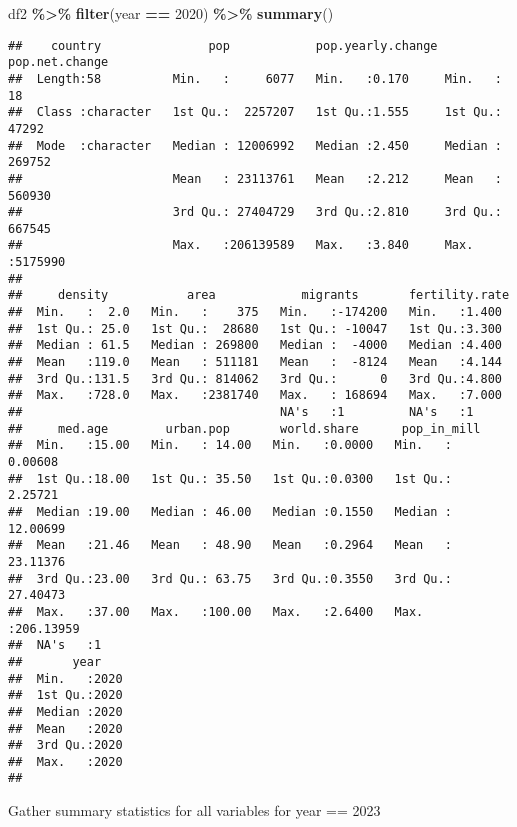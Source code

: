 \documentclass[
]{article}
\newenvironment{Shaded}{\begin{snugshade}}{\end{snugshade}}
\newcommand{\DecValTok}[1]{\textcolor[rgb]{0.00,0.00,0.81}{#1}}
\newcommand{\FunctionTok}[1]{\textcolor[rgb]{0.13,0.29,0.53}{\textbf{#1}}}
\newcommand{\NormalTok}[1]{#1}
\newcommand{\SpecialCharTok}[1]{\textcolor[rgb]{0.81,0.36,0.00}{\textbf{#1}}}
\begin{document}
\begin{Shaded}
\begin{Highlighting}[]
\NormalTok{df2 }\SpecialCharTok{\%\textgreater{}\%} 
  \FunctionTok{filter}\NormalTok{(year }\SpecialCharTok{==} \DecValTok{2020}\NormalTok{) }\SpecialCharTok{\%\textgreater{}\%} 
  \FunctionTok{summary}\NormalTok{()}
\end{Highlighting}
\end{Shaded}

\begin{verbatim}
##    country               pop            pop.yearly.change pop.net.change   
##  Length:58          Min.   :     6077   Min.   :0.170     Min.   :     18  
##  Class :character   1st Qu.:  2257207   1st Qu.:1.555     1st Qu.:  47292  
##  Mode  :character   Median : 12006992   Median :2.450     Median : 269752  
##                     Mean   : 23113761   Mean   :2.212     Mean   : 560930  
##                     3rd Qu.: 27404729   3rd Qu.:2.810     3rd Qu.: 667545  
##                     Max.   :206139589   Max.   :3.840     Max.   :5175990  
##                                                                            
##     density           area            migrants       fertility.rate 
##  Min.   :  2.0   Min.   :    375   Min.   :-174200   Min.   :1.400  
##  1st Qu.: 25.0   1st Qu.:  28680   1st Qu.: -10047   1st Qu.:3.300  
##  Median : 61.5   Median : 269800   Median :  -4000   Median :4.400  
##  Mean   :119.0   Mean   : 511181   Mean   :  -8124   Mean   :4.144  
##  3rd Qu.:131.5   3rd Qu.: 814062   3rd Qu.:      0   3rd Qu.:4.800  
##  Max.   :728.0   Max.   :2381740   Max.   : 168694   Max.   :7.000  
##                                    NA's   :1         NA's   :1      
##     med.age        urban.pop       world.share      pop_in_mill       
##  Min.   :15.00   Min.   : 14.00   Min.   :0.0000   Min.   :  0.00608  
##  1st Qu.:18.00   1st Qu.: 35.50   1st Qu.:0.0300   1st Qu.:  2.25721  
##  Median :19.00   Median : 46.00   Median :0.1550   Median : 12.00699  
##  Mean   :21.46   Mean   : 48.90   Mean   :0.2964   Mean   : 23.11376  
##  3rd Qu.:23.00   3rd Qu.: 63.75   3rd Qu.:0.3550   3rd Qu.: 27.40473  
##  Max.   :37.00   Max.   :100.00   Max.   :2.6400   Max.   :206.13959  
##  NA's   :1                                                            
##       year     
##  Min.   :2020  
##  1st Qu.:2020  
##  Median :2020  
##  Mean   :2020  
##  3rd Qu.:2020  
##  Max.   :2020  
## 
\end{verbatim}

Gather summary statistics for all variables for year == 2023
\end{document}
